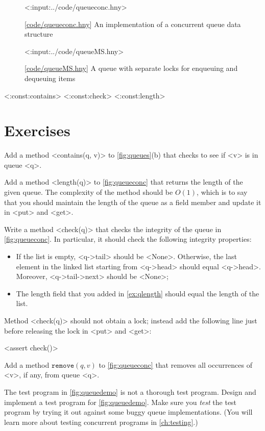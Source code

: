 \documentclass{report}
\newcommand{\harmonylink}[1]{%
[\href{https://harmony.cs.cornell.edu/#1}{\underline{#1}}]%
}
\newenvironment{code}{
\tcolorbox
}{
\endtcolorbox
}
\begin{document}
\begin{figure}
\begin{code}
<{:input:../code/queueconc.hny}>
\end{code}
\caption{\harmonylink{code/queueconc.hny} An implementation of a concurrent queue data structure}
\label{fig:queueconc}
\end{figure}

\begin{figure}
\begin{code}
<{:input:../code/queueMS.hny}>
\end{code}
\caption{\harmonylink{code/queueMS.hny} A queue with separate locks for enqueuing and dequeuing items}
\label{fig:queueMS}
\end{figure}

<{:const:contains}>
<{:const:check}>
<{:const:length}>

\section*{Exercises}
\begin{problems}
\item \label{ex:qcontains} Add a method <{contains(q, v)}> to
\autoref{fig:queues}(b) that checks to see if <{v}> is in queue <{q}>.
\item Add a method <{length(q)}> to \autoref{fig:queueconc} that returns the length of the given queue.
The complexity of the method should be $O(1)$, which is to say that you should maintain
the length of the queue as a field member and update it in <{put}> and <{get}>.
\item \label{ex:qlength} Write a method <{check(q)}>
that checks the integrity of the queue in \autoref{fig:queueconc}.
In particular, it should check the following integrity properties:
\begin{itemize}
\item If the list is empty, <{q->tail}> should be <{None}>.
Otherwise, the last element in the linked list starting from <{q->head}>
should equal <{q->head}>. Moreover,
<{q->tail->next}> should be <{None}>;
\item The length field that you added in \autoref{ex:qlength} should equal the length
of the list.
\end{itemize}
Method <{check(q)}> should not obtain a lock; instead add the following line
just before releasing the lock in <{put}> and <{get}>:
\begin{code}
<{assert check()}>
\end{code}
\item \label{ex:qremove} Add a method $\mathtt{remove}(q, v)$ to \autoref{fig:queueconc}
that removes all occurrences of <{v}>, if any, from queue <{q}>.
\item The test program in \autoref{fig:queuedemo} is not a thorough test program.
Design and implement a test program for \autoref{fig:queuedemo}.
Make sure you \emph{test} the test program by trying it out against some buggy
queue implementations.  (You will learn more about testing concurrent programs in \autoref{ch:testing}.)
\end{problems}
\end{document}
